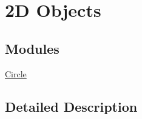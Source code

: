 \hypertarget{group___e_g_x_math-_geometry-2_d}{}\section{2D Objects}
\label{group___e_g_x_math-_geometry-2_d}
\subsection*{Modules}
\begin{DoxyCompactItemize}
\item 
\mbox{\hyperlink{group___e_g_x_math-_geometry-2_d-_circle}{Circle}}
\end{DoxyCompactItemize}


\subsection{Detailed Description}
